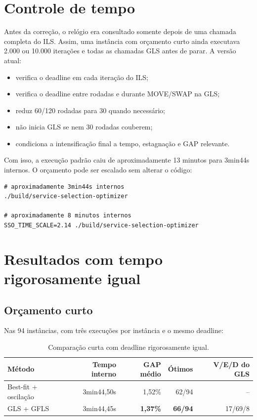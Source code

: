 \documentclass{article}
\begin{document}
\section{Controle de tempo}

Antes da correção, o relógio era consultado somente depois de uma chamada
completa do ILS. Assim, uma instância com orçamento curto ainda executava 2.000
ou 10.000 iterações e todas as chamadas GLS antes de parar. A versão atual:

\begin{itemize}
    \item verifica o deadline em cada iteração do ILS;
    \item verifica o deadline entre rodadas e durante MOVE/SWAP na GLS;
    \item reduz 60/120 rodadas para 30 quando necessário;
    \item não inicia GLS se nem 30 rodadas couberem;
    \item condiciona a intensificação final a tempo, estagnação e GAP relevante.
\end{itemize}

Com isso, a execução padrão caiu de aproximadamente 13 minutos para 3min44s
internos. O orçamento pode ser escalado sem alterar o código:

\begin{verbatim}
# aproximadamente 3min44s internos
./build/service-selection-optimizer

# aproximadamente 8 minutos internos
SSO_TIME_SCALE=2.14 ./build/service-selection-optimizer
\end{verbatim}

\section{Resultados com tempo rigorosamente igual}

\subsection{Orçamento curto}

Nas 94 instâncias, com três execuções por instância e o mesmo deadline:

\begin{table}[H]
\centering
\begin{tabular}{lrrrr}
\toprule
Método & Tempo interno & GAP médio & Ótimos & V/E/D do GLS \\
\midrule
Best-fit + oscilação & 3min44,50s & 1,52\% & 62/94 & -- \\
GLS + GFLS           & 3min44,45s & \textbf{1,37\%} & \textbf{66/94} & 17/69/8 \\
\bottomrule
\end{tabular}
\caption{Comparação curta com deadline rigorosamente igual.}
\end{table}
\end{document}
